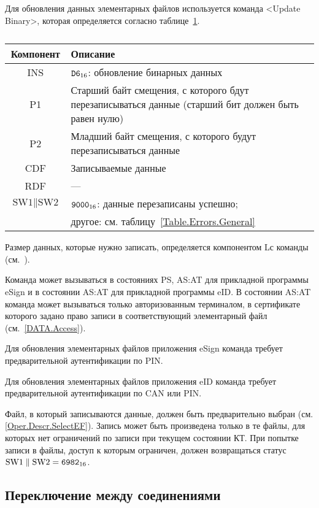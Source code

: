 Для обновления данных элементарных файлов используется
команда <Update Binary>, 
которая определяется согласно 
таблице~\ref{Table.Oper.UpdateCmd}.

\begin{table}[hbt]
\caption{}\label{Table.Oper.UpdateCmd}
\begin{tabular}{|c|p{14cm}|}
\hline
Компонент & Описание\\
\hline
\hline
INS & $\texttt{D6}_{16}$: обновление бинарных данных\\
\hline
P1 & Старший байт смещения, с которого бдут перезаписываться данные 
(старший бит должен быть равен нулю) \\
\hline
P2 & Младший байт смещения, с которого будут перезаписываться данные \\
\hline
CDF & Записываемые данные \\
\hline 
RDF &  --- \\
\hline
$\text{SW1} \parallel \text{SW2}$ & 
$\texttt{9000}_{16}$: данные перезаписаны успешно; \\
 & другое: см. таблицу~\ref{Table.Errors.General} \\
\hline
\end{tabular}
\end{table}

Размер данных, которые нужно записать, определяется компонентом Lс команды 
(см.~\cite{APDU}).

Команда может вызываться в состояниях PS, AS:AT 
для прикладной программы eSign и в состоянии 
AS:AT для прикладной программы eID.
В состоянии AS:AT команда может вызываться только 
авторизованным терминалом, в сертификате которого
задано право записи в соответствующий элементарный 
файл (см.~\ref{DATA.Access}).

Для обновления элементарных файлов приложения eSign команда требует 
предварительной аутентификации по PIN.

Для обновления элементарных файлов приложения eID команда требует 
предварительной аутентификации по CAN или PIN.

Файл, в который записываются данные, должен быть предварительно
выбран (см. \ref{Oper.Descr.SelectEF}).
Запись может быть произведена только в те файлы, для которых 
нет ограничений по записи при текущем состоянии КТ. 
При попытке записи в файлы, доступ к которым ограничен, 
должен возвращаться статус $\text{SW1} \parallel\text{SW2} = \texttt{6982}_{16}$. 


\subsection{Переключение между соединениями}
\label{Oper.Descr.SetCS}

